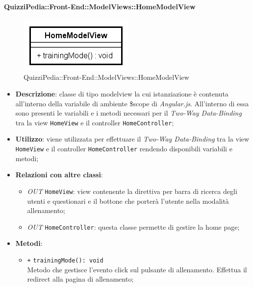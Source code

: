 \paragraph{QuizziPedia::Front-End::ModelViews::HomeModelView}
	
	\label{QuizziPedia::Front-End::ModelViews::HomeModelView}
	
	\begin{figure}[ht]
		\centering
		\includegraphics[scale=0.80,keepaspectratio]{UML/Classi/Front-End/QuizziPedia_Front-end_ModelView_HomeModelView.png}
		\caption{QuizziPedia::Front-End::ModelViews::HomeModelView}
	\end{figure} \FloatBarrier
	
	\begin{itemize}
		\item \textbf{Descrizione}: classe di tipo modelview la cui istanziazione è contenuta all'interno della variabile di ambiente \$scope di \textit{Angular.js}. All'interno di essa sono presenti le variabili e i metodi necessari per il \textit{Two-Way Data-Binding} tra la view \texttt{HomeView} e il controller \texttt{HomeController};
		\item \textbf{Utilizzo}: viene utilizzata per effettuare il \textit{Two-Way Data-Binding} tra la view \texttt{HomeView} e il controller \texttt{HomeController} rendendo disponibili variabili e metodi;
		\item \textbf{Relazioni con altre classi}: 
		\begin{itemize}
			\item \textit{OUT} \texttt{HomeView}: view contenente la direttiva per barra di ricerca degli utenti e questionari e il bottone che porterà l’utente nella modalità allenamento; 
			\item \textit{OUT} \texttt{HomeController}: questa classe permette di gestire la home page;
		\end{itemize}
		\item \textbf{Metodi}: 
		\begin{itemize}
			\item \texttt{+} \texttt{trainingMode(): void} \\
			Metodo che gestisce l’evento click sul pulsante di allenamento. Effettua il redirect alla pagina di allenamento;
		\end{itemize}
	\end{itemize}
	
	